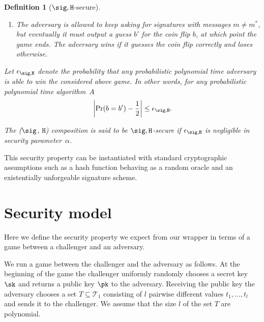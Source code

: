 \documentclass{article}
\newtheorem{definition}[theorem]{Definition}
\begin{document}
{\begin{definition}[$\sig, \texttt{H}$-secure]
\begin{enumerate}
\item The adversary is allowed to keep asking for signatures with messages $m \neq m^*$, but eventually it must output a guess $b'$ for the coin flip $b$, at which point the game ends. The adversary wins if it guesses the coin flip correctly and loses otherwise.
\end{enumerate}

Let $\epsilon_{\sig, \texttt{H}}$ denote the probability that any probabilistic polynomial time adversary is able to win the considered above game. In other words, for any probabilistic polynomial time algorithm~$A$		
$$\left \vert \Pr(b = b') -\frac{1}{2} \right \vert \le \epsilon_{\sig, \texttt{H}}.$$

The  ($\sig$, $\texttt{H}$) composition is said to be $\sig, \texttt{H}$-secure if $\epsilon_{\sig, \texttt{H}}$ is negligible in security parameter~$\alpha$.
\end{definition}


This security property can be instantiated with standard cryptographic assumptions such as a hash function behaving as a random oracle and an existentially unforgeable signature scheme.




\section{Security model} \label{sec:model}
Here we define the security property we expect from our wrapper in terms of a game between a challenger and an adversary.

We run a game between the challenger and the adversary as follows. At the beginning of the game the challenger uniformly randomly chooses a secret key $\sk$ and returns a public key $\pk$ to the adversary. Receiving the public key the adversary chooses a set $T \subseteq \mathcal{T}_1$ consisting of $l$ pairwise different values $t_1,\ldots,t_l$ and sends it to the challenger.  We assume that the size $l$ of the set $T$ are polynomial. 

% 

}
\end{document}
